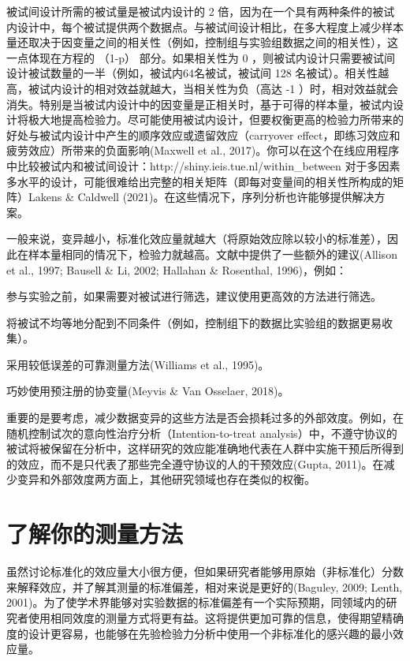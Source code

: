 \documentclass[
  letterpaper,
  DIV=11,
  numbers=noendperiod]{scrreprt}
\begin{document}
被试间设计所需的被试量是被试内设计的 2
倍，因为在一个具有两种条件的被试内设计中，每个被试提供两个数据点。与被试间设计相比，在多大程度上减少样本量还取决于因变量之间的相关性（例如，控制组与实验组数据之间的相关性），这一点体现在方程的
（1-p） 部分。如果相关性为 0
，则被试内设计只需要被试间设计被试数量的一半（例如，被试内64名被试，被试间
128 名被试）。相关性越高，被试内设计的相对效益就越大，当相关性为负（高达
-1
）时，相对效益就会消失。特别是当被试内设计中的因变量是正相关时，基于可得的样本量，被试内设计将极大地提高检验力。尽可能使用被试内设计，但要权衡更高的检验力所带来的好处与被试内设计中产生的顺序效应或遗留效应（carryover
effect，即练习效应和疲劳效应）所带来的负面影响(Maxwell et al.,
2017)。你可以在这个在线应用程序中比较被试内和被试间设计：http://shiny.ieis.tue.nl/within\_between
对于多因素多水平的设计，可能很难给出完整的相关矩阵（即每对变量间的相关性所构成的矩阵）Lakens
\& Caldwell (2021)。在这些情况下，序列分析也许能够提供解决方案。

一般来说，变异越小，标准化效应量就越大（将原始效应除以较小的标准差），因此在样本量相同的情况下，检验力就越高。文献中提供了一些额外的建议(Allison
et al., 1997; Bausell \& Li, 2002; Hallahan \& Rosenthal, 1996)，例如：

参与实验之前，如果需要对被试进行筛选，建议使用更高效的方法进行筛选。

将被试不均等地分配到不同条件（例如，控制组下的数据比实验组的数据更易收集）。

采用较低误差的可靠测量方法(Williams et al., 1995)。

巧妙使用预注册的协变量(Meyvis \& Van Osselaer, 2018)。

重要的是要考虑，减少数据变异的这些方法是否会损耗过多的外部效度。例如，在随机控制试次的意向性治疗分析（Intention-to-treat
analysis）中，不遵守协议的被试将被保留在分析中，这样研究的效应能准确地代表在人群中实施干预后所得到的效应，而不是只代表了那些完全遵守协议的人的干预效应(Gupta,
2011)。在减少变异和外部效度两方面上，其他研究领域也存在类似的权衡。

\hypertarget{sec-knowyourmeasure}{%
\section{了解你的测量方法}\label{sec-knowyourmeasure}}

虽然讨论标准化的效应量大小很方便，但如果研究者能够用原始（非标准化）分数来解释效应，并了解其测量的标准偏差，相对来说是更好的(Baguley,
2009; Lenth,
2001)。为了使学术界能够对实验数据的标准偏差有一个实际预期，同领域内的研究者使用相同效度的测量方式将更有益。这将提供更加可靠的信息，使得期望精确度的设计更容易，也能够在先验检验力分析中使用一个非标准化的感兴趣的最小效应量。
\end{document}

